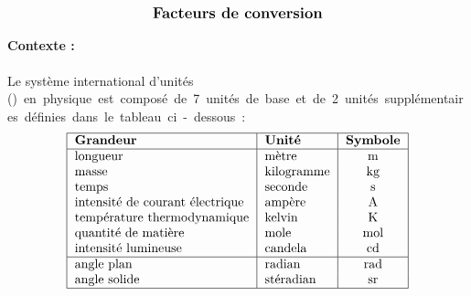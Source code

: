 \documentclass[11pt,a4paper]{article}
\begin{document}
\entete

\autoevaluation


$$\mbox{\textbf{\large Facteurs de conversion}}$$


\paragraph{Contexte :} Le système international d'unités (\si) en physique est 
composé de 7 unités de base et de 2 unités supplémentaires définies dans le
tableau ci-dessous :
{\footnotesize
$$\begin{tabular}{|l|l|c|}
\hline
\textbf{Grandeur} & \textbf{Unité} & \textbf{Symbole}\\ 
\hline 
longueur						& mètre			& m \\ 
masse 							& kilogramme	& kg \\ 
temps							& seconde		& s \\ 
intensité de courant électrique & ampère		& A \\ 
température thermodynamique 	& kelvin		& K \\ 
quantité de matière 			& mole			& mol \\ 
intensité lumineuse 			& candela		& cd \\ 
\hline 
angle plan 						& radian		& rad \\ 
angle solide					& stéradian		& sr \\ 
\hline 
\end{tabular}$$}
\end{document}
